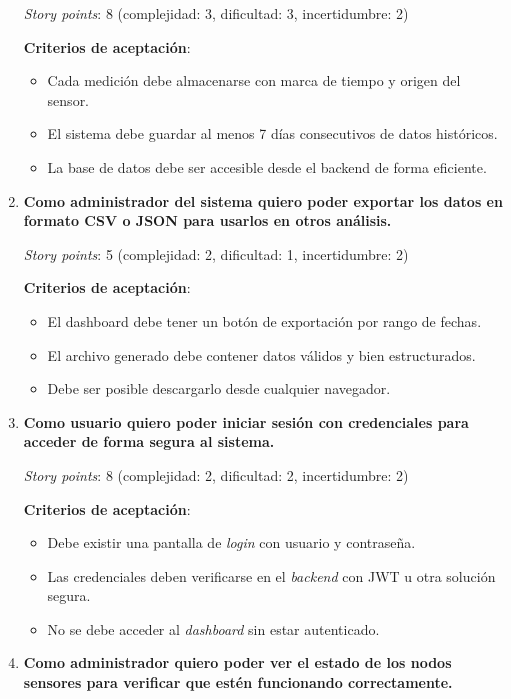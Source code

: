 \documentclass[
11pt, %
]{charter}
\begin{document}
\begin{enumerate}
    \textit{Story points}: 8 (complejidad: 3, dificultad: 3, incertidumbre: 2)

    \textbf{Criterios de aceptación}:
    \begin{itemize}
        \item Cada medición debe almacenarse con marca de tiempo y origen del sensor.
        \item El sistema debe guardar al menos 7 días consecutivos de datos históricos.
        \item La base de datos debe ser accesible desde el backend de forma eficiente.
    \end{itemize}

    \item \textbf{Como administrador del sistema quiero poder exportar los datos en formato CSV o JSON para usarlos en otros análisis.}

    \textit{Story points}: 5 (complejidad: 2, dificultad: 1, incertidumbre: 2)

    \textbf{Criterios de aceptación}:
    \begin{itemize}
        \item El dashboard debe tener un botón de exportación por rango de fechas.
        \item El archivo generado debe contener datos válidos y bien estructurados.
        \item Debe ser posible descargarlo desde cualquier navegador.
    \end{itemize}

    \item \textbf{Como usuario quiero poder iniciar sesión con credenciales para acceder de forma segura al sistema.}

    \textit{Story points}: 8 (complejidad: 2, dificultad: 2, incertidumbre: 2)

    \textbf{Criterios de aceptación}:
    \begin{itemize}
        \item Debe existir una pantalla de \textit{login} con usuario y contraseña.
        \item Las credenciales deben verificarse en el \textit{backend} con JWT u otra solución segura.
        \item No se debe acceder al \textit{dashboard} sin estar autenticado.
    \end{itemize}

    \item \textbf{Como administrador quiero poder ver el estado de los nodos sensores para verificar que estén funcionando correctamente.}


\end{enumerate}
\end{document}

